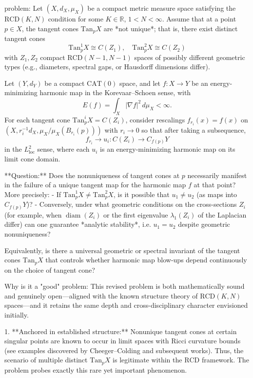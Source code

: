 problem:  
Let \((X,d_X,\mu_X)\) be a compact metric measure space satisfying the \(\mathrm{RCD}(K,N)\) condition for some \(K\in\mathbb{R}\), \(1 < N < \infty\).  
Assume that at a point \(p\in X\), the tangent cones \(\mathrm{Tan}_p X\) are *not unique*; that is, there exist distinct tangent cones 
\[
\mathrm{Tan}_p^1 X \cong C(Z_1), \quad \mathrm{Tan}_p^2 X \cong C(Z_2)
\]
with \(Z_1, Z_2\) compact \(\mathrm{RCD}(N-1,N-1)\) spaces of possibly different geometric types (e.g., diameters, spectral gaps, or Hausdorff dimensions differ).

Let \((Y,d_Y)\) be a compact \(\mathrm{CAT}(0)\) space, and let \(f:X\to Y\) be an energy-minimizing harmonic map in the Korevaar–Schoen sense, with  
\[
E(f) = \int_X |\nabla f|^2\,d\mu_X < \infty.
\]
For each tangent cone \(\mathrm{Tan}_p^i X = C(Z_i)\), consider rescalings \(f_{r_i}(x) = f(x)\) on \((X, r_i^{-1}d_X,\mu_X/\mu_X(B_{r_i}(p)))\) with \(r_i\to 0\) so that after taking a subsequence,  
\[
f_{r_i} \to u_i : C(Z_i) \to C_{f(p)}Y
\]
in the \(L^2_\mathrm{loc}\) sense, where each \(u_i\) is an energy-minimizing harmonic map on its limit cone domain.

**Question:**  
Does the nonuniqueness of tangent cones at \(p\) necessarily manifest in the failure of a unique tangent map for the harmonic map \(f\) at that point?  
More precisely:  
- If \(\mathrm{Tan}_p^1 X\neq \mathrm{Tan}_p^2 X\), is it possible that \(u_1\neq u_2\) (as maps into \(C_{f(p)}Y\))?  
- Conversely, under what geometric conditions on the cross-sections \(Z_i\) (for example, when \(\operatorname{diam}(Z_i)\) or the first eigenvalue \(\lambda_1(Z_i)\) of the Laplacian differ) can one guarantee *analytic stability*, i.e. \(u_1=u_2\) despite geometric nonuniqueness?  

Equivalently, is there a universal geometric or spectral invariant of the tangent cones \(\mathrm{Tan}_p X\) that controls whether harmonic map blow-ups depend continuously on the choice of tangent cone?

Why is it a "good" problem:  
This revised problem is both mathematically sound and genuinely open—aligned with the known structure theory of \(\mathrm{RCD}(K,N)\) spaces—and it retains the same depth and cross-disciplinary character envisioned initially.

1. **Anchored in established structure:**  
   Nonunique tangent cones at certain singular points are known to occur in limit spaces with Ricci curvature bounds (see examples discovered by Cheeger–Colding and subsequent works). Thus, the scenario of multiple distinct \(\mathrm{Tan}_p X\) is legitimate within the \(\mathrm{RCD}\) framework. The problem probes exactly this rare yet important phenomenon.

